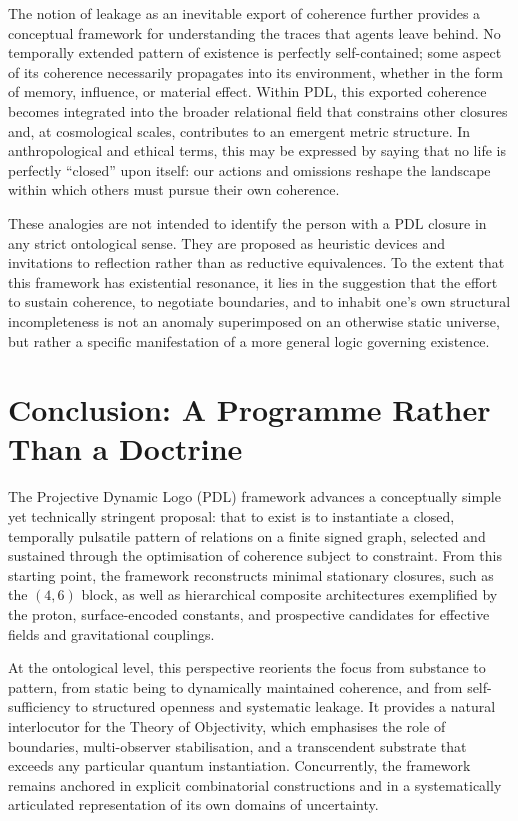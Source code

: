 \documentclass{article}
\theoremstyle{definition}
\newcommand{\PDL}{\ensuremath{\mathrm{PDL}}}
\begin{document}
The notion of leakage as an inevitable export of coherence further provides a conceptual framework for understanding the traces that agents leave behind.
No temporally extended pattern of existence is perfectly self-contained; some aspect of its coherence necessarily propagates into its environment, whether in the form of memory, influence, or material effect.
Within \PDL{}, this exported coherence becomes integrated into the broader relational field that constrains other closures and, at cosmological scales, contributes to an emergent metric structure.%
\cite{PDL_Topological_2026,PDL_Exponent18_2026_Refined}
In anthropological and ethical terms, this may be expressed by saying that no life is perfectly “closed” upon itself: our actions and omissions reshape the landscape within which others must pursue their own coherence.

These analogies are not intended to identify the person with a \PDL{} closure in any strict ontological sense.
They are proposed as heuristic devices and invitations to reflection rather than as reductive equivalences.
To the extent that this framework has existential resonance, it lies in the suggestion that the effort to sustain coherence, to negotiate boundaries, and to inhabit one’s own structural incompleteness is not an anomaly superimposed on an otherwise static universe, but rather a specific manifestation of a more general logic governing existence.

\section{Conclusion: A Programme Rather Than a Doctrine}
\label{sec:conclusion}

The Projective Dynamic Logo (PDL) framework advances a conceptually simple yet technically stringent proposal: that to exist is to instantiate a closed, temporally pulsatile pattern of relations on a finite signed graph, selected and sustained through the optimisation of coherence subject to constraint.%
\cite{PDL_Main_2026,PDL_Minimal_Closures_2026}
From this starting point, the framework reconstructs minimal stationary closures, such as the \((4,6)\) block, as well as hierarchical composite architectures exemplified by the proton, surface-encoded constants, and prospective candidates for effective fields and gravitational couplings.%
\cite{PDL_Alpha_2026_v2,PDL_Proton_Architecture_2026_v2,PDL_Effective_Fields_2026,PDL_Cavity_Modes_2026}

At the ontological level, this perspective reorients the focus from substance to pattern, from static being to dynamically maintained coherence, and from self-sufficiency to structured openness and systematic leakage.
It provides a natural interlocutor for the Theory of Objectivity, which emphasises the role of boundaries, multi-observer stabilisation, and a transcendent substrate that exceeds any particular quantum instantiation.%
\cite{PDL_TO_Dialogue_2026,PDL_Position_2026}
Concurrently, the framework remains anchored in explicit combinatorial constructions and in a systematically articulated representation of its own domains of uncertainty.%
\cite{PDL_Global_Mapping_2026_v3}
\end{document}
